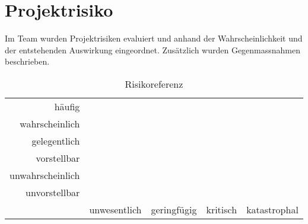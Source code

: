 \section{Projektrisiko}

Im Team wurden Projektrisiken evaluiert und anhand der Wahrscheinlichkeit und der entstehenden Auswirkung eingeordnet. Zusätzlich wurden Gegenmassnahmen beschrieben.

\begin{table}[h!]
	\centering
	\begin{tabular}{r || c c c c}
		häufig 		
		& \cellcolor{red} 
		& \cellcolor{red}
		& \cellcolor{red}
		& \cellcolor{red} \\
		wahrscheinlich		
		& \cellcolor{yellow} 
		& \cellcolor{yellow} 
		& \cellcolor{red}
		& \cellcolor{red} \\
		gelegentlich		
		& \cellcolor{yellow}
		& \cellcolor{yellow}
		& \cellcolor{yellow}
		& \cellcolor{red} \\
		vorstellbar		
		& \cellcolor{green}
		& \cellcolor{yellow}
		& \cellcolor{yellow}
		& \cellcolor{yellow} \\
		unwahrscheinlich	
		& \cellcolor{green}
		& \cellcolor{green}
		& \cellcolor{yellow}
		& \cellcolor{yellow} \\
		unvorstellbar		
		& \cellcolor{green}
		& \cellcolor{green}
		& \cellcolor{green}
		& \cellcolor{green} \\
		\hline
		& unwesentlich & geringfügig & kritisch & katastrophal
	\end{tabular}
	\caption{Risikoreferenz}
	\label{tab:risikoreferenz}
\end{table}


